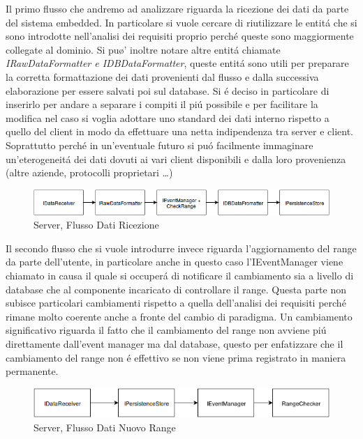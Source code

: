 Il primo flusso che andremo ad analizzare riguarda la ricezione dei dati da parte del sistema embedded. In particolare si vuole cercare di riutilizzare le entit\'a che si sono introdotte nell'analisi dei requisiti proprio perch\'e queste sono maggiormente collegate al dominio. Si pu\o' inoltre notare altre entit\'a chiamate \textit{IRawDataFormatter e IDBDataFormatter}, queste entit\'a sono utili per preparare la corretta formattazione dei dati provenienti dal flusso e dalla successiva elaborazione per essere salvati poi sul database. Si \'e deciso in particolare di inserirlo per andare a separare i compiti il pi\'u possibile e per facilitare la modifica nel caso si voglia adottare uno standard dei dati interno rispetto a quello del client in modo da effettuare una netta indipendenza tra server e client. Soprattutto perch\'e in un'eventuale futuro si pu\'o facilmente immaginare un'eterogeneit\'a dei dati dovuti ai vari client disponibili e dalla loro provenienza (altre aziende, protocolli proprietari \ldots)

\begin{figure}[h]
\centering
\includegraphics[width=\textwidth]{Figures/LogicArchitecture/Server/FlowDiagramReceiveData}
\caption{Server, Flusso Dati Ricezione}
\end{figure}

Il secondo flusso che si vuole introdurre invece riguarda l'aggiornamento del range da parte dell'utente, in particolare anche in questo caso l'IEventManager viene chiamato in causa il quale si occuper\'a di notificare il cambiamento sia a livello di database che al componente incaricato di controllare il range. Questa parte non subisce particolari cambiamenti rispetto a quella dell'analisi dei requisiti perch\'e rimane molto coerente anche a fronte del cambio di paradigma. Un cambiamento significativo riguarda il fatto che il cambiamento del range non avviene pi\'u direttamente dall'event manager ma dal database, questo per enfatizzare che il cambiamento del range non \'e effettivo se non viene prima registrato in maniera permanente.

\begin{figure}[h]
\centering
\includegraphics[width=\textwidth]{Figures/LogicArchitecture/Server/FlowDiagramNewRange}
\caption{Server, Flusso Dati Nuovo Range}
\end{figure}

